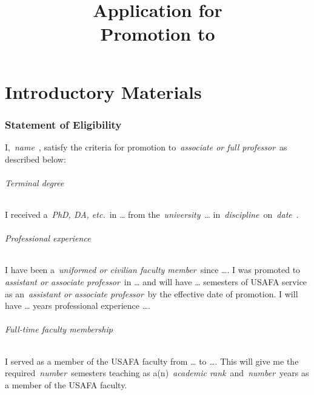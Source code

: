 \documentclass[11pt,titlepage]{article}
\title{Application for\\Promotion to \meta{Academic Rank}}
\author{\meta{Applicant Name}}
\date{\meta{Semester of Application}}
\providecommand*{\meta}[1]{%
  \textlangle\,\emph{#1}\,\textrangle%
}
\begin{document}
\maketitle

\tableofcontents
\clearpage
{}


\part{Introductory Materials}\label{section:introduction}  %

\section{Statement of Eligibility}  %

I, \meta{name}, satisfy the criteria for promotion to \meta{associate or full professor} as described below:

\paragraph{Terminal degree}
I received a \meta{PhD, DA, etc.} in \dots{} from the \meta{university} \dots{} in \meta{discipline} on \meta{date}.

\paragraph{Professional experience}
I have been a \meta{uniformed or civilian faculty member} since \dots.
I was promoted to \meta{assistant or associate professor} in \dots{} and will have \dots{} semesters of USAFA service as an \meta{assistant or associate professor} by the effective date of promotion.
I will have \dots{} years professional experience \dots.

\paragraph{Full-time faculty membership}
I served as a member of the USAFA faculty from \dots{} to \dots.
This will give me the required \meta{number} semesters teaching as a(n) \meta{academic rank} and \meta{number} years as a member of the USAFA faculty.
\end{document}
